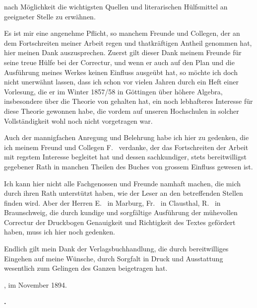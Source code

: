 
\noindent nach Möglichkeit die wichtigsten Quellen und literarischen Hülfsmittel an geeigneter Stelle zu erwähnen.

Es ist mir eine angenehme Pflicht, so manchem Freunde und Collegen, der an dem Fortschreiten meiner Arbeit regen und thatkräftigen Antheil genommen hat, hier meinen Dank auszusprechen. Zuerst gilt dieser Dank meinem Freunde  für seine treue Hülfe bei der Correctur, und wenn er auch auf den Plan und die Ausführung meines Werkes keinen Einfluss ausgeübt hat, so möchte ich doch nicht unerwähnt lassen, dass ich schon vor vielen Jahren durch ein Heft einer Vorlesung, die er im Winter 1857/58 in Göttingen über höhere Algebra, insbesondere über die Theorie von  gehalten hat, ein noch lebhafteres Interesse für diese Theorie gewonnen habe, die vordem auf unseren Hochschulen in solcher Vollständigkeit wohl noch nicht vorgetragen war.

Auch der mannigfachen Anregung und Belehrung habe ich hier zu gedenken, die ich meinem Freund und Collegen F.~ verdanke, der das Fortschreiten der Arbeit mit regstem Interesse begleitet hat und dessen sachkundiger, stets bereitwilligst gegebener Rath in manchen Theilen des Buches von grossem Einfluss gewesen ist.

Ich kann hier nicht alle Fachgenossen und Freunde namhaft machen, die mich durch ihren Rath unterstützt haben, wie der Leser an den betreffenden Stellen finden wird. Aber der Herren E.~ in Marburg, Fr.~ in Clausthal, R.~ in Braunschweig, die durch kundige und sorgfältige Ausführung der mühevollen Correctur der Druckbogen Genauigkeit und Richtigkeit des Textes gefördert haben, muss ich hier noch gedenken.

Endlich gilt mein Dank der Verlagsbuchhandlung, die durch bereitwilliges Eingehen auf meine Wünsche, durch Sorgfalt in Druck und Ausstattung wesentlich zum Gelingen des Ganzen beigetragen hat.

\bigskip

, im November 1894.

\medskip

\begin{flushright}
\textbf{.}
\end{flushright}
